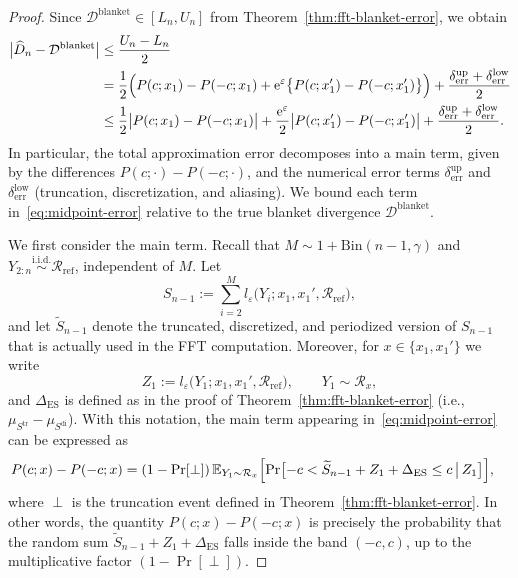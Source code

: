 \documentclass{article}
\theoremstyle{plain}
\theoremstyle{definition}
\begin{document}
\begin{proof}

Since $\mathcal{D}^{\mathrm{blanket}} \in [L_n,U_n]$ from Theorem~\ref{thm:fft-blanket-error}, we obtain
\begin{align}
  \bigl|\widehat D_n - \mathcal{D}^{\mathrm{blanket}}\bigr|
  &\le \frac{U_n - L_n}{2} \notag\\
  &= \frac{1}{2}
     \Bigl(
       P(c;x_1) - P(-c;x_1)
       + \mathrm e^\varepsilon\bigl\{P(c;x_1') - P(-c;x_1')\bigr\}
     \Bigr)
     + \frac{\delta^{\mathrm{up}}_\mathrm{err} + \delta^{\mathrm{low}}_\mathrm{err}}{2} \notag\\
  &\le \frac{1}{2}\bigl|P(c;x_1) - P(-c;x_1)\bigr|
     + \frac{\mathrm e^\varepsilon}{2}\bigl|P(c;x_1') - P(-c;x_1')\bigr|
     + \frac{\delta^{\mathrm{up}}_\mathrm{err} + \delta^{\mathrm{low}}_\mathrm{err}}{2}.
  \label{eq:midpoint-error}
\end{align}
In particular, the total approximation error decomposes into a main
term, given by the differences $P(c;\cdot)-P(-c;\cdot)$, and the
numerical error terms $\delta^{\mathrm{up}}_\mathrm{err}$ and $\delta^{\mathrm{low}}_\mathrm{err}$
(truncation, discretization, and aliasing).
We bound each term in~\eqref{eq:midpoint-error} relative to
the true blanket divergence $\mathcal{D}^{\mathrm{blanket}}$.



We first consider the main term.
Recall that $M \sim 1+\mathrm{Bin}(n-1,\gamma)$ and
$Y_{2:n} \stackrel{\mathrm{i.i.d.}}{\sim} \mathcal R_{\mathrm{ref}}$, independent of $M$.
Let
\[
  S_{n-1}
  :=
  \sum_{i=2}^M l_\varepsilon\bigl(Y_i;x_1,x_1',\mathcal R_{\mathrm{ref}}\bigr),
\]
and let $\widetilde S_{n-1}$ denote the truncated, discretized, and
periodized version of $S_{n-1}$ that is actually used in the FFT
computation.
Moreover, for $x\in\{x_1,x_1'\}$ we write
\[
  Z_1 := l_\varepsilon\bigl(Y_1;x_1,x_1',\mathcal R_{\mathrm{ref}}\bigr),
  \qquad Y_1 \sim \mathcal R_x,
\]
and $\Delta_{\mathrm{ES}}$ is defined as in the proof of
Theorem~\ref{thm:fft-blanket-error} (i.e., $\mu_{S^{\mathrm{tr}}}-\mu_{S^{\mathrm{di}}}$).
With this notation, the main term appearing in~\eqref{eq:midpoint-error}
can be expressed as
\begin{align}
  P(c;x) - P(-c;x)
  &= (1-\Pr[\perp])\,
     \mathbb E_{Y_1\sim\mathcal R_x}\Bigl[
       \Pr\bigl[-c
                < \widetilde S_{n-1} + Z_1 + \Delta_{\mathrm{ES}}
                \le c
                \,\big|\,
                Z_1
          \bigr]
     \Bigr],
  \label{eq:main-band-prob}
\end{align}
where $\perp$ is the truncation event defined in
Theorem~\ref{thm:fft-blanket-error}.
In other words, the quantity $P(c;x)-P(-c;x)$ is precisely the probability
that the random sum $\widetilde S_{n-1}+Z_1+\Delta_{\mathrm{ES}}$ falls
inside the band $(-c,c)$, up to the multiplicative factor $(1-\Pr[\perp])$.



\end{proof}
\end{document}
